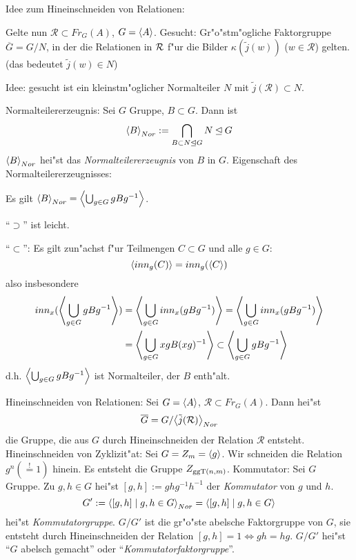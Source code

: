 \remark Idee zum Hineinschneiden von Relationen:{  
  Gelte nun $\mathcal R\subset Fr_G(A)$, $G={\left\langle A\right\rangle}$. Gesucht: 
  Gr"o"stm"ogliche Faktorgruppe $\overline G=G/N$, in der die
  Relationen in $\cal R$ f"ur die Bilder $\kappa(\tilde j(w))$ ($w\in\mathcal R$)
  gelten. (das bedeutet $\tilde j(w)\in N$)
  
  Idee: gesucht ist ein kleinstm"oglicher Normalteiler $N$ mit 
  $\tilde j(\mathcal R)\subset N$.
  }
 Normalteilererzeugnis:{
  Sei $G$ Gruppe, $B\subset G$. Dann ist 
  \[{\left\langle B\right\rangle}_{Nor}:=\bigcap_{B\subset N\unlhd G} N\unlhd  G
    \]
  ${\left\langle B\right\rangle}_{Nor}$ hei"st das \emph{Normalteilererzeugnis} von $B$ in $G$.
  }
\remark Eigenschaft des Normalteilererzeugnisses:{
  \label{rem:nt-product}
  Es gilt ${\left\langle B\right\rangle}_{Nor}={\left\langle\bigcup_{g\in G} gBg^{-1}\right\rangle}$. 
  
  ``$\supset$'' ist leicht.
  
  ``$\subset$'': Es gilt zun"achst f"ur Teilmengen $C\subset G$ und alle $g\in G$:
  \[{\left\langle inn_g(C)\right\rangle}=inn_g({\left\langle C\right\rangle})
    \]
  also insbesondere
  \begin{align*}
    inn_x({\left\langle\bigcup_{g\in G} gBg^{-1}\right\rangle})
    &={\left\langle\bigcup_{g\in G} inn_x( gBg^{-1})\right\rangle}
    ={\left\langle\bigcup_{g\in G} inn_x( gBg^{-1})\right\rangle}\\
    &={\left\langle\bigcup_{g\in G}  xgB(xg)^{-1}\right\rangle}
    \subset {\left\langle\bigcup_{g\in G}  gBg^{-1}\right\rangle}
    \end{align*}
  d.h. ${\left\langle\bigcup_{g\in G} gBg^{-1}\right\rangle}$ ist Normalteiler, der $B$ enth"alt.
  }
 Hineinschneiden von Relationen:{
  Sei $G={\left\langle A\right\rangle}$, $\mathcal R\subset Fr_G(A)$. Dann hei"st
  \[\overline G=G/{\left\langle\tilde j(\mathcal R)\right\rangle}_{Nor}
    \]
  die Gruppe, die aus $G$ durch Hineinschneiden der Relation $\mathcal R$ 
  entsteht.
  }
\example Hineinschneiden von Zyklizit"at:{
  Sei $G=Z_m={\left\langle g\right\rangle}$. Wir schneiden die Relation $g^n(\overset!=1)$ hinein.
  Es entsteht die Gruppe $Z_{\operatorname{ggT}(n,m)}$.
  }
 Kommutator:{
  Sei $G$ Gruppe. Zu $g,h\in G$ hei"st $[g,h]:=ghg^{-1}h^{-1}$ der
  \emph{Kommutator} von $g$ und $h$.
  \[G':={\left\langle[g,h]\mid g,h \in G\right\rangle}_{Nor}={\left\langle[g,h]\mid g,h \in G\right\rangle}
    \]
  hei"st \emph{Kommutatorgruppe}.
  $G/G'$ ist die gr"o"ste abelsche Faktorgruppe von $G$, sie entsteht
  durch Hineinschneiden der Relation $[g,h]=1\iff gh=hg$.
  $G/G'$ hei"st ``$G$ abelsch gemacht'' oder ``\emph{Kommutatorfaktorgruppe}''.
  }
